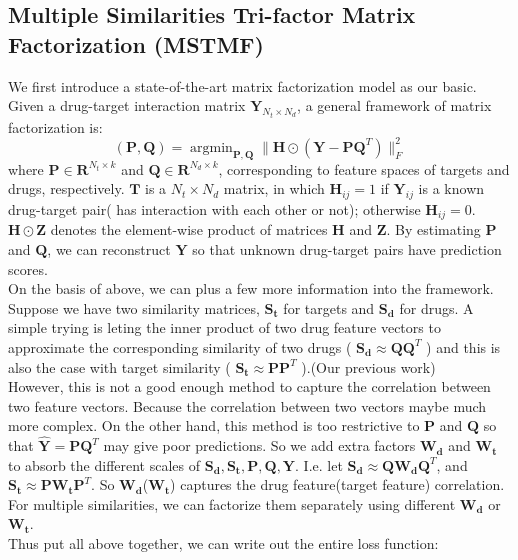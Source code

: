 \documentclass{article}
\begin{document}
\subsection{Multiple Similarities Tri-factor Matrix Factorization (MSTMF)}
We first introduce a state-of-the-art matrix factorization model as our basic. Given a drug-target interaction matrix $\bm{Y}_{N_t\times N_d}$, a general framework of matrix factorization is:
\begin{equation}
(\bm{P},\bm{Q})=\mathop{\arg\min}_{\bm{P},\bm{Q}}\|\bm{H}\odot(\bm{Y}-\bm{P}\bm{Q}^T)\|_F^2
\end{equation}
where $\bm{P}\in\bm{R}^{N_t\times k}$ and $\bm{Q}\in\bm{R}^{N_d\times k}$, corresponding to feature spaces of targets and drugs, respectively. $\bm{T}$ is a $N_t\times N_d$ matrix, in which $\bm{H}_{ij}=1$ if $\bm{Y}_{ij}$ is a known drug-target pair( has interaction with each other or not); otherwise $\bm{H}_{ij}=0$. $\bm{H} \odot \bm{Z}$ denotes the element-wise product of matrices $\bm{H}$ and $\bm{Z}$. By estimating $\bm{P}$ and $\bm{Q}$, we can reconstruct $\bm{Y}$ so that unknown drug-target pairs have prediction scores.\\
\indent On the basis of above, we can plus a few more information into the framework. Suppose we have two similarity matrices, $\bm{S_t}$ for targets and $\bm{S_d}$ for drugs. A simple trying is leting the inner product of two drug feature vectors to approximate the corresponding similarity of two drugs ( $\bm{S_d}\approx\bm{Q}\bm{Q}^T$ ) and this is also the case with target similarity ( $\bm{S_t}\approx\bm{P}\bm{P}^T$ ).(Our previous work\cite{zheng2013collaborative}) \\
\indent However, this is not a good enough method to capture the correlation between two feature vectors. Because the correlation between two vectors maybe much more complex. On the other hand, this method is too restrictive to $\bm{P}$ and $\bm{Q}$ so that $\bm{\hat{Y}}=\bm{P}\bm{Q}^T$ may give poor predictions. So we add extra factors $\bm{W_d}$ and $\bm{W_t}$ to absorb the different scales of $\bm{S_d}, \bm{S_t}, \bm{P}, \bm{Q}, \bm{Y}$. I.e. let $\bm{S_d}\approx\bm{Q}\bm{W_d}\bm{Q}^T$, and $\bm{S_t}\approx\bm{P}\bm{W_t}\bm{P}^T$.\cite{tang2013exploiting} So $\bm{W_d}$($\bm{W_t}$) captures the drug feature(target feature) correlation. For multiple similarities, we can factorize them separately using different $\bm{W_d}$ or $\bm{W_t}$. \\
\indent Thus put all above together, we can write out the entire loss function:  \\
\end{document}
